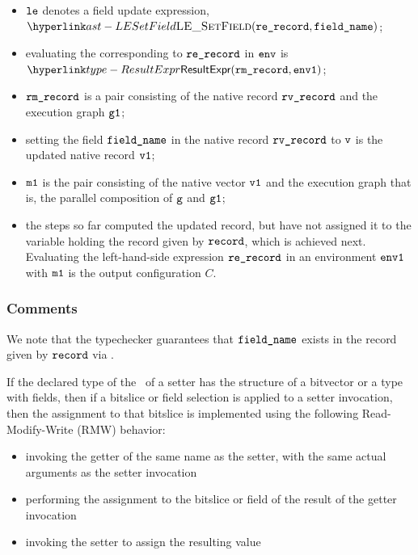 \ProseParagraph
\AllApply
\begin{itemize}
  \item $\vle$ denotes a field update expression, $\LESetField(\rerecord, \fieldname)$;
  \item evaluating the \rhsexpression{} corresponding to $\rerecord$
  in $\env$ is $\ResultExpr(\rmrecord, \envone)$\ProseOrAbnormal;
  \item $\rmrecord$ is a pair consisting of the native record $\rvrecord$ and
  the execution graph $\vgone$;
  \item setting the field $\fieldname$ in the native record $\rvrecord$ to $\vv$
  is the updated native record $\vvone$;
  \item $\vmone$ is the pair consisting of the native vector $\vvone$ and the
  execution graph that is, the parallel composition of $\vg$ and $\vgone$;
  \item the steps so far computed the updated record, but have not assigned it to
  the variable holding the record given by $\record$, which is achieved next.
  Evaluating the left-hand-side expression $\rerecord$ in an environment $\envone$ with $\vmone$
  is the output configuration $C$.
\end{itemize}

\FormallyParagraph
\begin{mathpar}
\end{mathpar}

\subsubsection{Comments}
We note that the typechecker guarantees that $\fieldname$ exists in the record given by $\record$
via .

If the declared type of the \rhsexpression\ of a setter has the structure of a
bitvector or a type with fields, then if a bitslice or field selection is
applied to a setter invocation, then the assignment to that bitslice is
implemented using the following Read-Modify-Write (RMW) behavior:
\begin{itemize}
    \item invoking the getter of the same name as the setter, with the same actual
    arguments as the setter invocation
    \item performing the assignment to the bitslice or field of the result of the
    getter invocation
    \item invoking the setter to assign the resulting value
\end{itemize}
